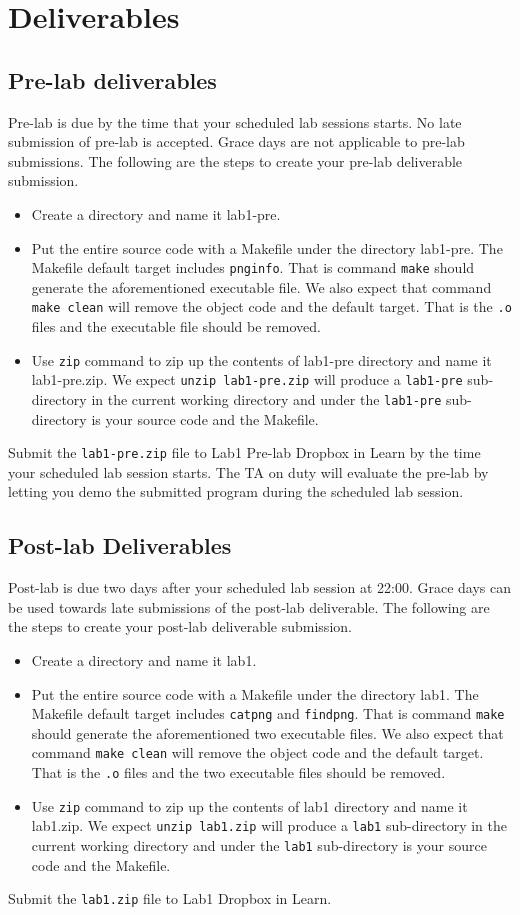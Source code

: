 \section{Deliverables}
\subsection{Pre-lab deliverables}
\label{lab1_prelab_deliverable}
Pre-lab is due by the time that your scheduled lab sessions starts. No late submission of pre-lab is accepted. Grace days are not applicable to pre-lab submissions. The following are the steps to create your pre-lab deliverable submission.
\begin{itemize}
\item Create a directory and name it lab1-pre.
\item Put the entire source code with a Makefile under the directory lab1-pre. The Makefile default target includes \verb+pnginfo+. That is command \verb+make+ should generate the aforementioned executable file. We also expect that command \verb+make clean+ will remove the object code and the default target. That is the \verb+.o+ files and the executable file should be removed.
\item Use \verb+zip+ command to zip up the contents of lab1-pre directory and name it lab1-pre.zip. We expect \verb+unzip lab1-pre.zip+ will produce a \verb+lab1-pre+ sub-directory in the current working directory and under the \verb+lab1-pre+ sub-directory is your source code and the Makefile.
\end{itemize}
Submit the \verb+lab1-pre.zip+ file to Lab1 Pre-lab Dropbox in Learn by the time your scheduled lab session starts. The TA on duty will evaluate the pre-lab by letting you demo the submitted program during the scheduled lab session.

\subsection{Post-lab Deliverables}
Post-lab is due two days after your scheduled lab session at 22:00. Grace days can be used towards late submissions of the post-lab deliverable. The following are the steps to create your post-lab deliverable submission.
\begin{itemize}
\item Create a directory and name it lab1.
\item Put the entire source code with a Makefile under the directory lab1. The Makefile default target includes \verb+catpng+ and \verb+findpng+. That is command \verb+make+ should generate the aforementioned two executable files. We also expect that command \verb+make clean+ will remove the object code and the default target. That is the \verb+.o+ files and the two executable files should be removed.
\item Use \verb+zip+ command to zip up the contents of lab1 directory and name it lab1.zip. We expect \verb+unzip lab1.zip+ will produce a \verb+lab1+ sub-directory in the current working directory and under the \verb+lab1+ sub-directory is your source code and the Makefile.
\end{itemize}
Submit the \verb+lab1.zip+ file to Lab1 Dropbox in Learn.
